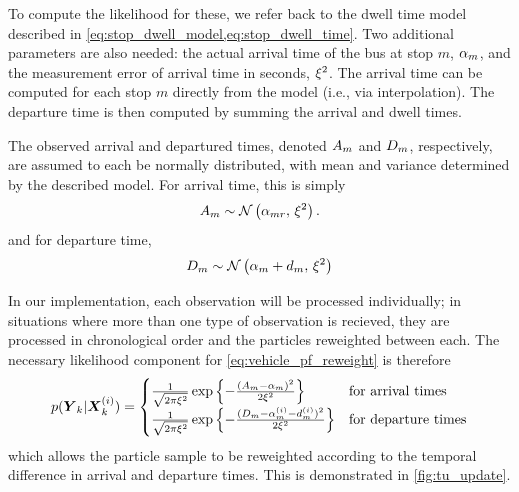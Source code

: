 To compute the likelihood for these, we refer back to the dwell time model described in \cref{eq:stop_dwell_model,eq:stop_dwell_time}. Two additional parameters are also needed: the actual arrival time of the bus at stop $m$, $\alpha_{m}$, and the measurement error of arrival time in seconds, $\xi^2$. The arrival time can be computed for each stop $m$ directly from the model (i.e., via interpolation). The departure time is then computed by summing the arrival and dwell times.


The observed arrival and departured times, denoted $A_m$ and $D_m$, respectively, are assumed to each be normally distributed, with mean and variance determined by the described model. For arrival time, this is simply
\begin{equation}
\label{eq:tu_arr_lhood}
A_m \sim \mathcal{N}\left(\alpha_{mr},\, \xi^2\right).
\end{equation}
and for departure time,
\begin{equation}
\label{eq:tu_dep_lhood}
D_m \sim \mathcal{N}\left(\alpha_m + d_m,\, \xi^2\right)
\end{equation}


In our \pf{} implementation, each observation will be processed individually; in situations where more than one type of observation is recieved, they are processed in chronological order and the particles reweighted between each. The necessary likelihood component for \cref{eq:vehicle_pf_reweight} is therefore
\begin{equation}
\label{eq:tu_obs_lhood}
p(\boldsymbol{Y}_k | \boldsymbol{X}^{(i)}_k) =
\begin{cases}
\frac{1}{\sqrt{2\pi\xi^2}}
    \exp\left\{
        -\frac{(A_m - \alpha_m)^2}{2\xi^2}
    \right\} & \text{for arrival times} \\
\frac{1}{\sqrt{2\pi\xi^2}}
    \exp\left\{
        -\frac{(D_m - \alpha^{(i)}_m - d^{(i)}_m)^2}{2\xi^2}
    \right\} & \text{for departure times}
\end{cases}
\end{equation}
which allows the particle sample to be reweighted according to the temporal difference in arrival and departure times. This is demonstrated in \cref{fig:tu_update}.

